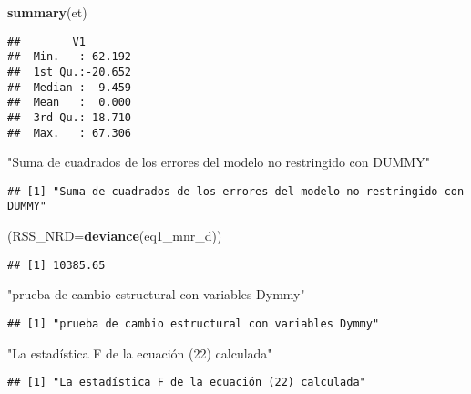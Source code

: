 \documentclass[
]{article}
\newenvironment{Shaded}{\begin{snugshade}}{\end{snugshade}}
\newcommand{\DataTypeTok}[1]{\textcolor[rgb]{0.13,0.29,0.53}{#1}}
\newcommand{\KeywordTok}[1]{\textcolor[rgb]{0.13,0.29,0.53}{\textbf{#1}}}
\newcommand{\NormalTok}[1]{#1}
\newcommand{\StringTok}[1]{\textcolor[rgb]{0.31,0.60,0.02}{#1}}
\begin{document}
\begin{Shaded}
\begin{Highlighting}[]
\KeywordTok{summary}\NormalTok{(et)}
\end{Highlighting}
\end{Shaded}

\begin{verbatim}
##        V1         
##  Min.   :-62.192  
##  1st Qu.:-20.652  
##  Median : -9.459  
##  Mean   :  0.000  
##  3rd Qu.: 18.710  
##  Max.   : 67.306
\end{verbatim}

\begin{Shaded}
\begin{Highlighting}[]
\StringTok{"Suma de cuadrados de los errores del modelo no restringido con DUMMY"}
\end{Highlighting}
\end{Shaded}

\begin{verbatim}
## [1] "Suma de cuadrados de los errores del modelo no restringido con DUMMY"
\end{verbatim}

\begin{Shaded}
\begin{Highlighting}[]
\NormalTok{(}\DataTypeTok{RSS_NRD=}\KeywordTok{deviance}\NormalTok{(eq1_mnr_d))}
\end{Highlighting}
\end{Shaded}

\begin{verbatim}
## [1] 10385.65
\end{verbatim}

\begin{Shaded}
\begin{Highlighting}[]
\StringTok{"prueba de cambio estructural con variables Dymmy"}
\end{Highlighting}
\end{Shaded}

\begin{verbatim}
## [1] "prueba de cambio estructural con variables Dymmy"
\end{verbatim}

\begin{Shaded}
\begin{Highlighting}[]
\StringTok{"La estadística F de la ecuación (22) calculada"}
\end{Highlighting}
\end{Shaded}

\begin{verbatim}
## [1] "La estadística F de la ecuación (22) calculada"
\end{verbatim}
\end{document}
